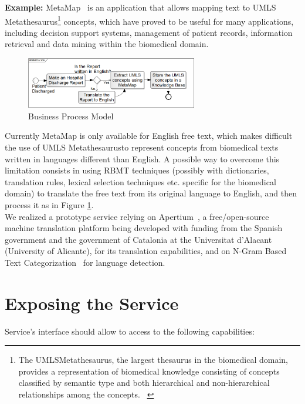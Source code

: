 \documentclass[11pt]{article}
\begin{document}
{\bf Example:} MetaMap~\cite{metamap} is an application that allows mapping text to UMLS\textregistered 
Metathesaurus\textregistered\footnote{The UMLS\textregistered Metathesaurus\textregistered, the largest thesaurus in the biomedical domain, 
provides a representation of biomedical knowledge consisting of concepts classified by semantic type and both hierarchical and non-hierarchical 
relationships among the concepts. ~\cite{umls}} concepts, which have proved to be useful for many applications, including decision support 
systems, management of patient records, information retrieval and data mining within the biomedical domain.

\begin{figure}[!ht]
\begin{center}
\includegraphics[width=7.5cm]{mtsoa}
\end{center}
\caption{Business Process Model}
\label{fig:mtsoa}
\end{figure}

Currently MetaMap is only available for English free text, which makes difficult the use of UMLS\textregistered 
Metathesaurus\textregistered to represent concepts from biomedical texts written in languages different than English.
A possible way to overcome this limitation consists in using RBMT techniques (possibly with dictionaries, translation rules, 
lexical selection techniques etc. specific for the biomedical domain) to translate the free text from its original language 
to English, and then process it as in Figure \ref{fig:mtsoa}.\\

We realized a prototype service relying on Apertium~\cite{armentano05p}, a free/open-source machine translation platform being 
developed with funding from the Spanish government and the government of Catalonia at the Universitat d'Alacant (University of Alicante), 
for its translation capabilities, and on N-Gram Based Text Categorization~\cite{textcat} for language detection.

\section{Exposing the Service}

Service's interface should allow to access to the following capabilities:
\end{document}
